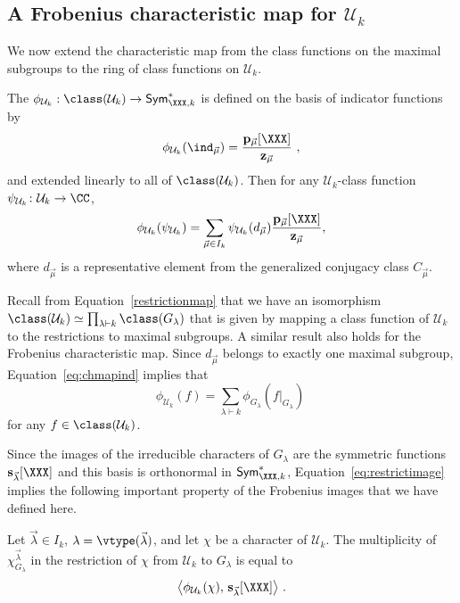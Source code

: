 \subsection{A Frobenius characteristic map for $\mathcal{U}_k$}
\label{subsec:UkFrob}
We now extend the characteristic map from the class functions
on the maximal subgroups to the ring of class functions
on $\mathcal{U}_k$.

The 
$\phi_{\mathcal{U}_k}: \class(\mathcal{U}_k) \to \mathsf{Sym}^{\ast}_{\XXX,k}$
is defined on the basis of indicator functions by
\begin{equation}\label{eq:chmapind}
\phi_{\mathcal{U}_k}( \ind_{\vec{\mu}} ) = \frac{\mathbf{p}_{\vec{\mu}}[\XXX]}{\mathbf{z}_{\vec{\mu}}}~,
\end{equation}
and extended linearly to all of $\class(\mathcal{U}_k)$.
Then for any $\mathcal{U}_k$-class function
$\psi_{\mathcal{U}_k} \colon \mathcal{U}_k \rightarrow \CC$,
\begin{equation}
\label{equation.phi Uk}
    \phi_{\mathcal{U}_k}( \psi_{\mathcal{U}_k} ) = \sum_{\vec{\mu}\in I_k}
    \psi_{\mathcal{U}_k}(d_{\vec{\mu}}) \frac{\mathbf{p}_{\vec{\mu}}[\XXX]}{\mathbf{z}_{\vec{\mu}}},
\end{equation}
where $d_{\vec{\mu}}$ is a representative element from the
generalized conjugacy class $C_{\vec{\mu}}$.

Recall from Equation~\eqref{restrictionmap} that we have an isomorphism
$\class(\mathcal{U}_k) \simeq \prod_{\lambda \vdash k} \class(G_\lambda)$
that is given by mapping a class function of $\mathcal{U}_k$ to the
restrictions to maximal subgroups.
A similar result also holds for the Frobenius characteristic map.
Since $d_{\vec{\mu}}$ belongs to exactly one maximal subgroup,
Equation~\eqref{eq:chmapind} implies that
\begin{equation}\label{eq:restrictimage}
\phi_{\mathcal{U}_k}( f ) = \sum_{\lambda \vdash k}
\phi_{G_\lambda}( f |_{G_\lambda})~
\end{equation}
for any $f \in \class({\mathcal{U}_k})$.

Since the images of the irreducible characters of $G_\lambda$ are the symmetric
functions $\mathbf{s}_{\vec{\lambda}}[\XXX]$
and this basis is orthonormal in $\mathsf{Sym}^{\ast}_{\XXX,k}$,
Equation~\eqref{eq:restrictimage} implies the following important property
of the Frobenius images that we have defined here.

\begin{prop}\label{prop:multiplicity}
Let $\vec{\lambda} \in I_k$, $\lambda = \vtype(\vec{\lambda})$,
and let $\chi$ be a character of $\mathcal{U}_k$.
The multiplicity of $\chi_{G_\lambda}^{\vec{\lambda}}$
in the restriction of $\chi$ from $\mathcal{U}_k$ to $G_\lambda$
is equal to
\[
    \big\langle \phi_{\mathcal{U}_k}( \chi ), \, \mathbf{s}_{\vec{\lambda}}[\XXX] \big\rangle~.
\]
\end{prop}

